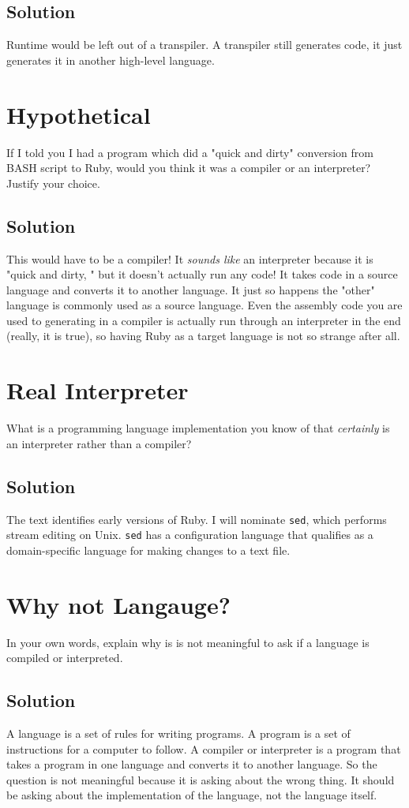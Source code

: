 \documentclass[twoside=false, DIV=14]{scrartcl}
\begin{document}
\subsection*{Solution}
Runtime would be left out of a transpiler.  A transpiler still generates code, it just generates it in another high-level language.

\section*{Hypothetical}
  If I told you I had a program which did a "quick and dirty" conversion from BASH script to Ruby, would you think it was a compiler or an interpreter?  Justify your choice.
  \subsection*{Solution}
  This would have to be a compiler! It \emph{sounds like} an interpreter because it is "quick and dirty, " but it doesn't actually run any code! It takes code in a source language and converts it to another language. It just so happens the "other" language is commonly used as a source language. Even the assembly code you are used to generating in a compiler is actually run through an interpreter in the end (really, it is true), so having Ruby as a target language is not so strange after all.

\section*{Real Interpreter}
What is a programming language implementation you know of that \emph{certainly} is an interpreter rather than a compiler?

  \subsection*{Solution}
  The text identifies early versions of Ruby. I will nominate \texttt{sed}, which performs stream editing on Unix. \texttt{sed} has a configuration language that qualifies as a domain-specific language for making changes to a text file.

\section*{Why not Langauge?}
In your own words, explain why is is not meaningful to ask if a language is compiled or interpreted.

\subsection*{Solution}
A language is a set of rules for writing programs.  A program is a set of instructions for a computer to follow.  A compiler or interpreter is a program that takes a program in one language and converts it to another language.  So the question is not meaningful because it is asking about the wrong thing.  It should be asking about the implementation of the language, not the language itself.  
\end{document}
